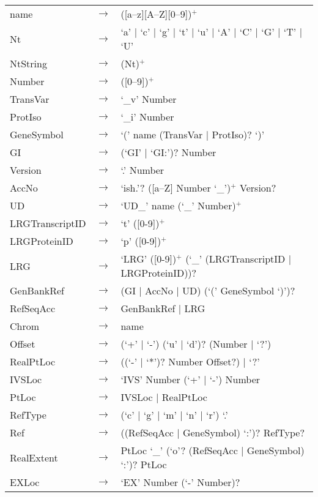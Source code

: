 \begin{longtable}{llp{7cm}}
name     & $\rightarrow$ & ([a--z][A--Z][0--9])$^+$\\
Nt       & $\rightarrow$ & `a' $|$ `c' $|$ `g' $|$ `t' $|$ `u' $|$ `A' $|$ 
                           `C' $|$ `G' $|$ `T' $|$ `U'\\
NtString & $\rightarrow$ & (Nt)$^+$\\
Number & $\rightarrow$ & ([0--9])$^+$\\
TransVar   & $\rightarrow$ & `\_v' Number\\
ProtIso    & $\rightarrow$ & `\_i' Number\\
GeneSymbol & $\rightarrow$ & `(' name (TransVar $|$ ProtIso)? `)'\\
GI         & $\rightarrow$ & (`GI' $|$ `GI:')? Number\\
Version    & $\rightarrow$ & `.' Number\\
AccNo      & $\rightarrow$ & `ish.'? ([a--Z] Number `\_')$^+$ Version? \\
UD         & $\rightarrow$ & `UD\_' name (`\_' Number)$^+$\\
LRGTranscriptID & $\rightarrow$ & `t' ([0-9])$^+$\\
LRGProteinID    & $\rightarrow$ & `p' ([0-9])$^+$\\
LRG             & $\rightarrow$ & `LRG' ([0-9])$^+$ (`\_' (LRGTranscriptID $|$ 
                  LRGProteinID))?\\
GenBankRef  & $\rightarrow$ & (GI $|$ AccNo $|$ UD) (`(' GeneSymbol `)')?\\
RefSeqAcc & $\rightarrow$ & GenBankRef $|$ LRG\\
Chrom & $\rightarrow$ & name\\
Offset & $\rightarrow$ & (`+' $|$ `-') (`u' $|$ `d')? (Number $|$ `?')\\
RealPtLoc & $\rightarrow$ & ((`-' $|$ `*')? Number Offset?) $|$ `?'\\
IVSLoc & $\rightarrow$ & `IVS' Number (`+' $|$ `-') Number\\
PtLoc  & $\rightarrow$ & IVSLoc $|$ RealPtLoc\\
RefType & $\rightarrow$ & (`c' $|$ `g' $|$ `m' $|$ `n' $|$ `r') `.'\\
Ref & $\rightarrow$ & ((RefSeqAcc $|$ GeneSymbol) `:')? RefType?\\
RealExtent & $\rightarrow$ & PtLoc `\_' (`o'? (RefSeqAcc $|$ GeneSymbol) `:')? PtLoc\\
EXLoc & $\rightarrow$ & `EX' Number (`-' Number)?\\

\end{longtable}
